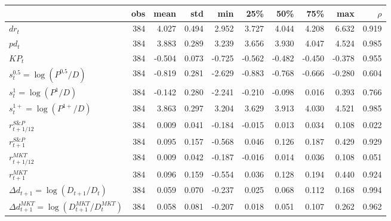 \begin{tabular}{lrrrrrrrrr}
\toprule
 & obs & mean & std & min & 25\% & 50\% & 75\% & max & $\rho$ \\
\midrule
$dr_t$ & 384 & 4.027 & 0.494 & 2.952 & 3.727 & 4.044 & 4.208 & 6.632 & 0.919 \\
$pd_t$ & 384 & 3.883 & 0.289 & 3.239 & 3.656 & 3.930 & 4.047 & 4.524 & 0.985 \\
$KP_t$ & 384 & -0.504 & 0.073 & -0.725 & -0.562 & -0.482 & -0.450 & -0.378 & 0.955 \\
$s_t^{0.5} = \log\left(P^{0.5}/D\right)$ & 384 & -0.819 & 0.281 & -2.629 & -0.883 & -0.768 & -0.666 & -0.280 & 0.604 \\
$s_t^1 = \log\left(P^1/D\right)$ & 384 & -0.142 & 0.280 & -2.241 & -0.210 & -0.098 & 0.016 & 0.393 & 0.766 \\
$s_t^{1+} = \log\left(P^{1+}/D\right)$ & 384 & 3.863 & 0.297 & 3.204 & 3.629 & 3.913 & 4.030 & 4.521 & 0.985 \\
$r^{S\&P}_{t+1/12}$ & 384 & 0.009 & 0.041 & -0.184 & -0.015 & 0.013 & 0.034 & 0.108 & 0.022 \\
$r^{S\&P}_{t+1}$ & 384 & 0.095 & 0.157 & -0.568 & 0.046 & 0.126 & 0.187 & 0.429 & 0.929 \\
$r^{MKT}_{t+1/12}$ & 384 & 0.009 & 0.042 & -0.187 & -0.016 & 0.014 & 0.036 & 0.108 & 0.051 \\
$r^{MKT}_{t+1}$ & 384 & 0.096 & 0.159 & -0.554 & 0.036 & 0.128 & 0.194 & 0.440 & 0.924 \\
$\Delta d_{t+1} = \log\left(D_{t+1}/D_t\right)$ & 384 & 0.059 & 0.070 & -0.237 & 0.025 & 0.068 & 0.112 & 0.168 & 0.994 \\
$\Delta d^{MKT}_{t+1} = \log\left(D^{MKT}_{t+1}/D^{MKT}_t\right)$ & 384 & 0.058 & 0.081 & -0.207 & 0.018 & 0.051 & 0.107 & 0.262 & 0.962 \\
\bottomrule
\end{tabular}
